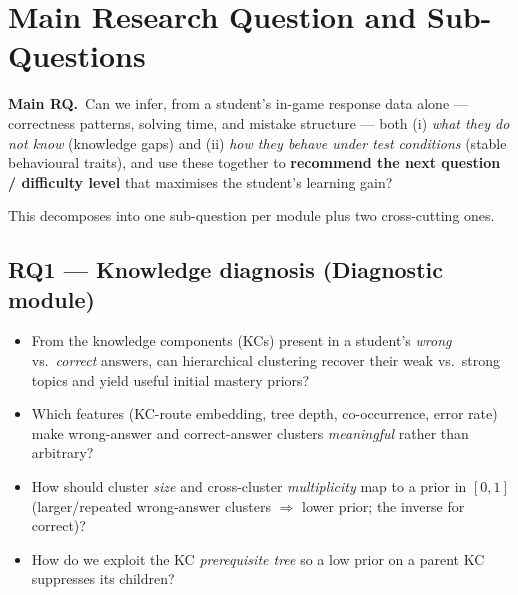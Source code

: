 \documentclass[11pt]{article}
\newcommand{\rqbox}[2]{\begin{mdframed}[backgroundcolor=lightbg,linecolor=nblue,linewidth=1pt,roundcorner=3pt,skipabove=4pt,skipbelow=4pt]\textbf{\color{nblue}#1}\, #2\end{mdframed}}
\begin{document}
\section{Main Research Question and Sub-Questions}\label{sec:rq}

\rqbox{Main RQ.}{Can we infer, from a student's in-game response data alone --- correctness patterns, solving time, and mistake structure --- both (i) \emph{what they do not know} (knowledge gaps) and (ii) \emph{how they behave under test conditions} (stable behavioural traits), and use these together to \textbf{recommend the next question / difficulty level} that maximises the student's learning gain?}

\medskip
This decomposes into one sub-question per module plus two cross-cutting ones.

\subsection{RQ1 --- Knowledge diagnosis (Diagnostic module)}
\begin{itemize}
\item[\textbf{RQ1}] From the knowledge components (KCs) present in a student's \emph{wrong} vs.\ \emph{correct} answers, can hierarchical clustering recover their weak vs.\ strong topics and yield useful initial mastery priors?
\item[RQ1.1] Which features (KC-route embedding, tree depth, co-occurrence, error rate) make wrong-answer and correct-answer clusters \emph{meaningful} rather than arbitrary?
\item[RQ1.2] How should cluster \emph{size} and cross-cluster \emph{multiplicity} map to a prior in $[0,1]$ (larger/repeated wrong-answer clusters $\Rightarrow$ lower prior; the inverse for correct)?
\item[RQ1.3] How do we exploit the KC \emph{prerequisite tree} so a low prior on a parent KC suppresses its children?
\end{itemize}
\end{document}
